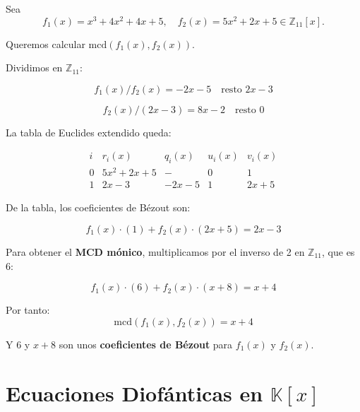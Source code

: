 \documentclass[a4paper,12pt]{article}
\begin{document}
\begin{ejemplo}[title=Ejemplo de MCD y Coeficientes de Bézout en $\mathbb{Z}_{11}$]
Sea 
\[
f_1(x) = x^3 + 4x^2 + 4x + 5, \quad f_2(x) = 5x^2 + 2x + 5 \in \mathbb{Z}_{11}[x].
\]

Queremos calcular \(\text{mcd}(f_1(x),f_2(x))\).

Dividimos en \(\mathbb{Z}_{11}\):

\[
f_1(x)  / f_2(x) = -2x-5 \quad \text{resto } \boxed{2x-3}
\]

\[
f_2(x) / (2x-3) = 8x-2 \quad \text{resto } 0
\]

La tabla de Euclides extendido queda:

\[
\begin{array}{c|c|c|c|c}
i & r_i(x) & q_i(x) & u_i(x) & v_i(x) \\
\hline
0 & 5x^2+2x+5 & - & 0 & 1 \\
1 & \boxed{2x-3} & -2x-5 & 1 & 2x+5
\end{array}
\]

De la tabla, los coeficientes de Bézout son:

\[
f_1(x) \cdot (1) + f_2(x) \cdot (2x+5) = \boxed{2x-3}
\]

Para obtener el \textbf{MCD mónico}, multiplicamos por el inverso de 2 en \(\mathbb{Z}_{11}\), que es 6:

\[
f_1(x) \cdot (6) + f_2(x) \cdot (x+8) = x+4
\]

Por tanto:
\[
\text{mcd}(f_1(x), f_2(x)) = x+4
\]

Y 6 y \(x+8\) son unos \textbf{coeficientes de Bézout} para \(f_1(x)\) y \(f_2(x)\).
\end{ejemplo}


\section{Ecuaciones Diofánticas en \(\mathbb{K}[x]\)}
\end{document}
